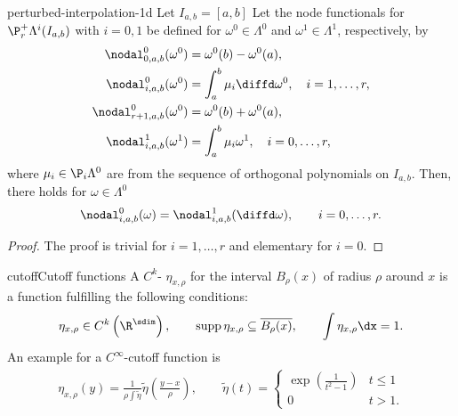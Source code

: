 \begin{Lemma}{perturbed-interpolation-1d}
  Let $I_{a,b} = [a,b]$ Let the node functionals for
  $\P_r^+\Lambda^i(I_{a,b})$ with $i=0,1$ be defined for
  $\omega^0\in\Lambda^0$ and $\omega^1\in\Lambda^1$, respectively, by
  \begin{align}
    \nodal_{0,a,b}^0(\omega^0) &= \omega^0(b) - \omega^0(a),\\
    \nodal_{i,a,b}^0(\omega^0) &= \int_a^b \mu_i\diffd\omega^0 ,
                                 \quad i=1,\dots,r,
    \\
    \nodal_{r+1,a,b}^0(\omega^0) &= \omega^0(b) + \omega^0(a),\\
    \nodal_{i,a,b}^1(\omega^1) &= \int_a^b \mu_i\omega^1 ,\quad i=0,\dots,r,
  \end{align}
  where $\mu_i\in \P_i\Lambda^0$ are from the sequence of orthogonal
  polynomials on $I_{a,b}$. Then, there holds for $\omega\in\Lambda^0$
  \begin{gather}
    \nodal_{i,a,b}^0(\omega) = \nodal_{i,a,b}^1(\diffd\omega), \qquad i=0,\dots,r.
  \end{gather}
\end{Lemma}

\begin{proof}
  The proof is trivial for $i=1,\dots,r$ and elementary for $i=0$.
\end{proof}

\begin{Definition*}{cutoff}{Cutoff functions}
  A $C^k$- $\eta_{x,\rho}$ for the interval $B_\rho(x)$ of radius
  $\rho$ around $x$ is a function fulfilling the following conditions:
  \begin{gather}
    \eta_{x,\rho} \in C^k\left(\R^\sdim\right),\qquad
    \operatorname{supp} \eta_{x,\rho}  \subseteq \overline{B_\rho(x)},\qquad
    \int \eta_{x,\rho} \dx = 1.
  \end{gather}
  An example for a $C^\infty$-cutoff function is
  \begin{gather}
    \eta_{x,\rho}(y) = \frac1{\rho\int\tilde\eta} \tilde\eta\left(\tfrac{y-x}{\rho}\right),
    \qquad
    \tilde\eta(t) =
    \begin{cases}
      \exp\left(\tfrac1{t^2-1}\right) & t\le 1\\
      0 & t>1.
    \end{cases}
  \end{gather}
\end{Definition*}

